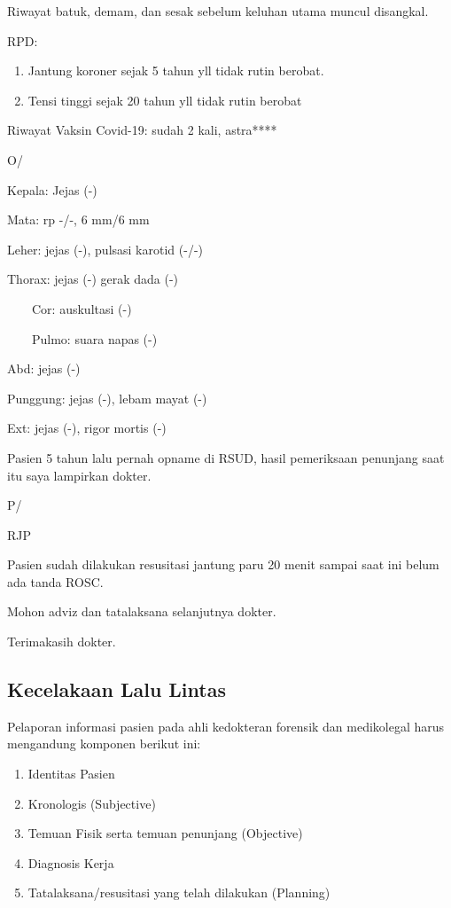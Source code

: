 \documentclass[
]{book}
\begin{document}
Riwayat batuk, demam, dan sesak sebelum keluhan utama muncul disangkal.

RPD:

\begin{enumerate}
\def\labelenumi{\arabic{enumi}.}
\item
  Jantung koroner sejak 5 tahun yll tidak rutin berobat.
\item
  Tensi tinggi sejak 20 tahun yll tidak rutin berobat
\end{enumerate}

Riwayat Vaksin Covid-19: sudah 2 kali, astra****

O/

Kepala: Jejas (-)

Mata: rp -/-, 6 mm/6 mm

Leher: jejas (-), pulsasi karotid (-/-)

Thorax: jejas (-) gerak dada (-)

~~~~Cor: auskultasi (-)

~~~~Pulmo: suara napas (-)

Abd: jejas (-)

Punggung: jejas (-), lebam mayat (-)

Ext: jejas (-), rigor mortis (-)

Pasien 5 tahun lalu pernah opname di RSUD, hasil pemeriksaan penunjang saat itu saya lampirkan dokter.

P/

RJP

Pasien sudah dilakukan resusitasi jantung paru 20 menit sampai saat ini belum ada tanda ROSC.

Mohon adviz dan tatalaksana selanjutnya dokter.

Terimakasih dokter.

\hypertarget{kecelakaan-lalu-lintas}{%
\subsection{Kecelakaan Lalu Lintas}\label{kecelakaan-lalu-lintas}}

Pelaporan informasi pasien pada ahli kedokteran forensik dan medikolegal harus mengandung komponen berikut ini:

\begin{enumerate}
\def\labelenumi{\arabic{enumi}.}
\item
  Identitas Pasien
\item
  Kronologis (Subjective)
\item
  Temuan Fisik serta temuan penunjang (Objective)
\item
  Diagnosis Kerja
\item
  Tatalaksana/resusitasi yang telah dilakukan (Planning)
\end{enumerate}
\end{document}
